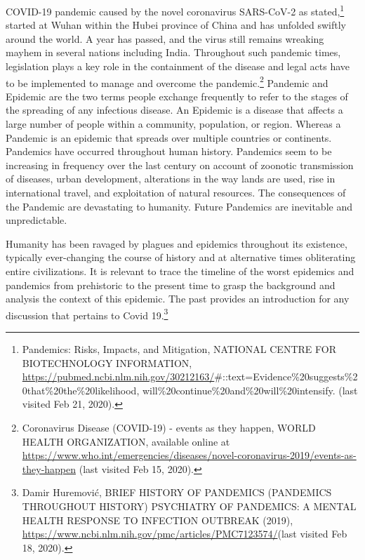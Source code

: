 \begin{multicols}{2}
\noi
COVID-19 pandemic caused by the novel coronavirus SARS-CoV-2 as stated,\footnote{Pandemics: Risks, Impacts, and Mitigation, NATIONAL CENTRE FOR BIOTECHNOLOGY INFORMATION,\\
 \url{https://pubmed.ncbi.nlm.nih.gov/30212163/}\#::text=Evidence\%20suggests\%20that\%20the\%20likelihood, will\%20continue\%20and\%20will\%20intensify. (last visited Feb 21, 2020).} started at
Wuhan within the Hubei province of China and has unfolded swiftly around the world. A
year has passed, and the virus still remains wreaking mayhem in several nations including
India. Throughout such pandemic times, legislation plays a key role in the containment of the
disease and legal acts have to be implemented to manage and overcome the pandemic.\footnote{Coronavirus Disease (COVID-19) - events as they happen, WORLD HEALTH ORGANIZATION, available online at\\ \url{https://www.who.int/emergencies/diseases/novel-coronavirus-2019/events-as-they-happen} (last visited Feb 15, 2020).}
Pandemic and Epidemic are the two terms people exchange frequently to refer to the stages
of the spreading of any infectious disease. An Epidemic is a disease that affects a large
number of people within a community, population, or region. Whereas a Pandemic is an
epidemic that spreads over multiple countries or continents. Pandemics have occurred
throughout human history. Pandemics seem to be increasing in frequency over the last
century on account of zoonotic transmission of diseases, urban development, alterations in
the way lands are used, rise in international travel, and exploitation of natural resources. The 
consequences of the Pandemic are devastating to humanity. Future Pandemics are inevitable
and unpredictable.

\noi
Humanity has been ravaged by plagues and epidemics throughout its existence, typically
ever-changing the course of history and at alternative times obliterating entire civilizations. It
is relevant to trace the timeline of the worst epidemics and pandemics from prehistoric to the
present time to grasp the background and analysis the context of this epidemic. The past
provides an introduction for any discussion that pertains to Covid 19.\footnote{Damir Huremović, BRIEF HISTORY OF PANDEMICS (PANDEMICS THROUGHOUT HISTORY) PSYCHIATRY OF PANDEMICS: A MENTAL HEALTH RESPONSE TO INFECTION OUTBREAK (2019), \url{https://www.ncbi.nlm.nih.gov/pmc/articles/PMC7123574/}(last visited Feb 18, 2020).}


\end{multicols}
